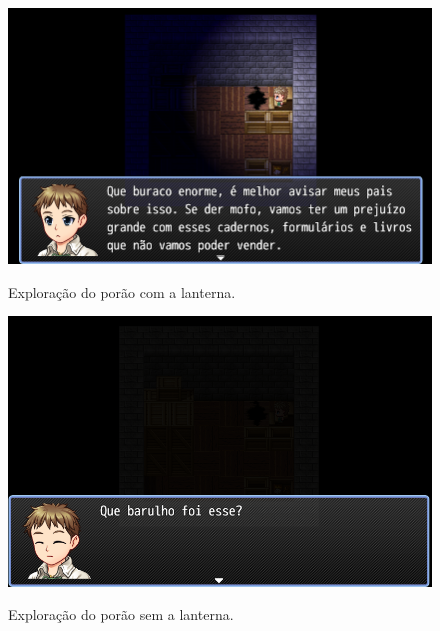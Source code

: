 \begin{figure}[!htbp]
	\centering
	\caption{Exploração do porão com a lanterna.}
	\includegraphics[scale=0.55]{Textuais/Pictures/explorando-porao-com-lanterna.png}
	\label{fig:explorando-porao-com-lanterna}
\end{figure}

\begin{figure}[!htbp]
	\centering
	\caption{Exploração do porão sem a lanterna.}
	\includegraphics[scale=0.55]{Textuais/Pictures/explorando-porao-sem-lanterna.png}
	\label{fig:explorando-porao-sem-lanterna}
\end{figure}

